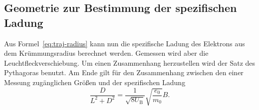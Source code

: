 \subsection{Geometrie zur Bestimmung der spezifischen Ladung}

Aus Formel~\eqref{eq:traj-radius} kann nun die spezifische Ladung des
Elektrons aus dem Krümmungsradius berechnet werden. Gemessen wird aber
die Leuchtfleckverschiebung. Um einen Zusammenhang herzustellen wird der
Satz des Pythagoras benutzt. Am Ende gilt für den Zusammenhang zwischen
den einer Messung zugänglichen Größen und der spezifischen Ladung
%
\begin{equation}
  \label{eq:spec-charge-measurement}
  \frac{D}{L^2+D^2} = \frac{1}{\sqrt{8U_\text{B}}} \sqrt{\frac{e_0}{m_0}} B.
\end{equation}
